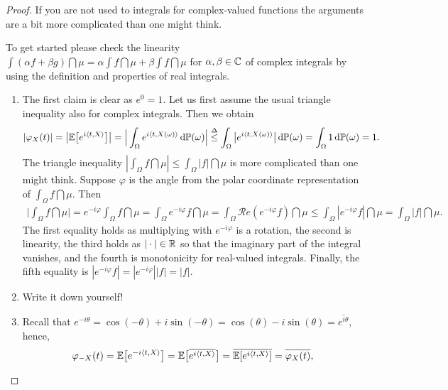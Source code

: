 \begin{proof}[Proof]
	If you are not used to integrals for complex-valued functions the arguments are a bit more complicated than one might think.
	\begin{luebung}
		To get started please check the linearity $\int (\alpha f+\beta g)\dint \mu=\alpha \int f \dint \mu+\beta \int f \dint \mu$ for $\alpha, \beta \in\mathbb{C}$ of complex integrals by using the definition and properties of real integrals.
	\end{luebung}
	\begin{enumerate}[label=(\roman*)]
		\item The first claim is clear as $e^0=1$. Let us first assume the usual triangle inequality also for complex integrals. Then we obtain
			\begin{align*}
				\lvert \varphi_X(t) \rvert 
				= \big| \mathbb{E} \big[ e^{i \langle t,X \rangle} \big] \big| 
				= \Big| \int_{\Omega} e^{i \langle t, X(\omega) \rangle} \, \mathrm{d} \mathbb{P}(\omega) \Big|
				\overset{\Delta}{\leq} \int_{\Omega} \big| e^{i \langle t, X(\omega) \rangle} \big| \, \mathrm{d} \mathbb{P}(\omega)
				= \int_\Omega 1\, \mathrm{d} \mathbb P(\omega) = 1.
			\end{align*}
			The triangle inequality $|\int_\Omega f\dint \mu|\leq \int_\Omega |f|\dint \mu$ is more complicated than one might think. Suppose $\varphi$ is the angle from the polar coordinate representation of $\int_\Omega f\dint \mu$. Then
			\begin{align*}
				\Big|\int_\Omega f \dint \mu \Big| = e^{-i\varphi} \int_\Omega f \dint \mu
				=\int_\Omega e^{-i\varphi} f \dint \mu
				=\int_\Omega \mathcal{R}e(e^{-i\varphi} f) \dint \mu
				\leq \int_\Omega |e^{-i\varphi} f| \dint \mu
				= \int_\Omega  |f| \dint \mu.
			\end{align*}
			The first equality holds as multiplying with $e^{-i\varphi}$ is a rotation, the second is linearity, the third holds as $|\cdot|\in \mathbb{R}$ so that the imaginary part of the integral vanishes, and the fourth is monotonicity for real-valued integrals. Finally, the fifth equality is $|e^{-i\varphi}f|=|e^{-i\varphi}||f|=|f|$.
		\item
			Write it down yourself!
		\item Recall that
			$e^{-i\theta} = \cos(-\theta) + i \sin(-\theta) = \cos(\theta) - i \sin(\theta) = \overline{e^{i \theta}}$, hence, 
			\begin{align*}
				\varphi_{-X}(t) = \E \big[ e^{-i \langle t, X \rangle} \big] = \E \big[ \overline{ e^{i \langle t, X \rangle}} \big] = \overline{\E [ e^{i \langle t, X \rangle}]} = \overline{\varphi_X(t)},

\end{align*}
\end{enumerate}
\end{proof}

